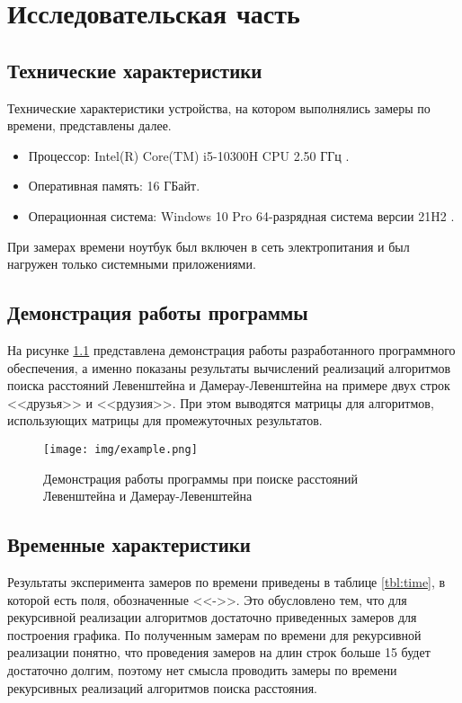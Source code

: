 \chapter{Исследовательская часть}

\section{Технические характеристики}

Технические характеристики устройства, на котором выполнялись замеры по времени, представлены далее.

\begin{itemize}
	\item Процессор: Intel(R) Core(TM) i5-10300H CPU 2.50 ГГц \cite{intel}.
	\item Оперативная память: 16 ГБайт.
	\item Операционная система: Windows 10 Pro 64-разрядная система версии 21H2 \cite{windows}.
\end{itemize}

При замерах времени ноутбук был включен в сеть электропитания и был нагружен только системными приложениями.

\section{Демонстрация работы программы}

На рисунке \ref{img:demonstration} представлена демонстрация работы разработанного программного обеспечения, а именно показаны результаты вычислений реализаций алгоритмов поиска расстояний Левенштейна и Дамерау-Левенштейна на примере двух строк <<друзья>> и <<рдузия>>. При этом выводятся матрицы для алгоритмов, использующих матрицы для промежуточных результатов.  
\clearpage
\begin{figure}[h]
	\centering
	\texttt{[image: img/example.png]}
	\caption{Демонстрация работы программы при поиске расстояний Левенштейна и Дамерау-Левенштейна}
	\label{img:demonstration}
\end{figure}

\clearpage

\section{Временные характеристики}

Результаты эксперимента замеров по времени приведены в таблице \ref{tbl:time}, в которой есть поля, обозначенные <<\-->>. Это обусловлено тем, что для рекурсивной реализации алгоритмов достаточно приведенных замеров для построения графика. По полученным замерам по времени для рекурсивной реализации понятно, что проведения замеров на длин строк больше 15 будет достаточно долгим, поэтому нет смысла проводить замеры по времени рекурсивных реализаций алгоритмов поиска расстояния.

